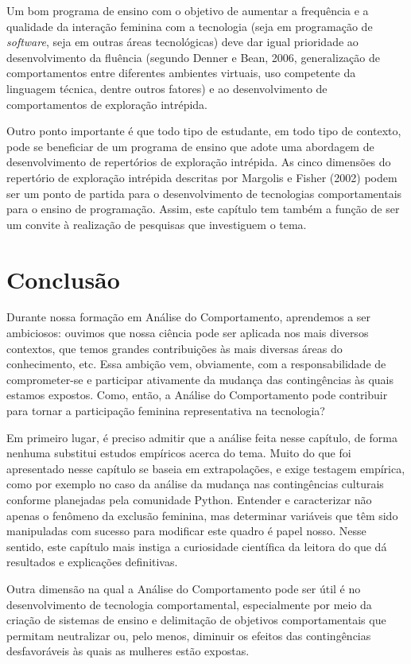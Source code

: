 Um bom programa de ensino com o objetivo de aumentar a frequência e a qualidade da interação feminina com a tecnologia (seja em programação de \textit{software}, seja em outras áreas tecnológicas) deve dar igual prioridade ao desenvolvimento da fluência (segundo Denner e Bean, 2006, generalização de comportamentos entre diferentes ambientes virtuais, uso competente da linguagem técnica, dentre outros fatores) e ao desenvolvimento de comportamentos de exploração intrépida.

Outro ponto importante é que todo tipo de estudante, em todo tipo de contexto, pode se beneficiar de um programa de ensino que adote uma abordagem de desenvolvimento de repertórios de exploração intrépida. As cinco dimensões do repertório de exploração intrépida descritas por Margolis e Fisher (2002) podem ser um ponto de partida para o desenvolvimento de tecnologias comportamentais para o ensino de programação. Assim, este capítulo tem também a função de ser um convite à realização de pesquisas que investiguem o tema. 

\section{Conclusão}

Durante nossa formação em Análise do Comportamento, aprendemos a ser ambiciosos: ouvimos que nossa ciência pode ser aplicada nos mais diversos contextos, que temos grandes contribuições às mais diversas áreas do conhecimento, etc. Essa ambição vem, obviamente, com a responsabilidade de comprometer-se e participar ativamente da mudança das contingências às quais estamos expostos. Como, então, a Análise do Comportamento pode contribuir para tornar a participação feminina representativa na tecnologia? 

Em primeiro lugar, é preciso admitir que a análise feita nesse capítulo, de forma nenhuma substitui estudos empíricos acerca do tema. Muito do que foi apresentado nesse capítulo se baseia em extrapolações, e exige testagem empírica, como por exemplo no caso da análise da mudança nas contingências culturais conforme planejadas pela comunidade Python. Entender e caracterizar não apenas o fenômeno da exclusão feminina, mas determinar variáveis que têm sido manipuladas com sucesso para modificar este quadro é papel nosso. Nesse sentido, este capítulo mais instiga a curiosidade científica da leitora do que dá resultados e explicações definitivas.

Outra dimensão na qual a Análise do Comportamento pode ser útil é no desenvolvimento de tecnologia comportamental, especialmente por meio da criação de sistemas de ensino e delimitação de objetivos comportamentais que permitam neutralizar ou, pelo menos, diminuir os efeitos das contingências desfavoráveis às quais as mulheres estão expostas.

